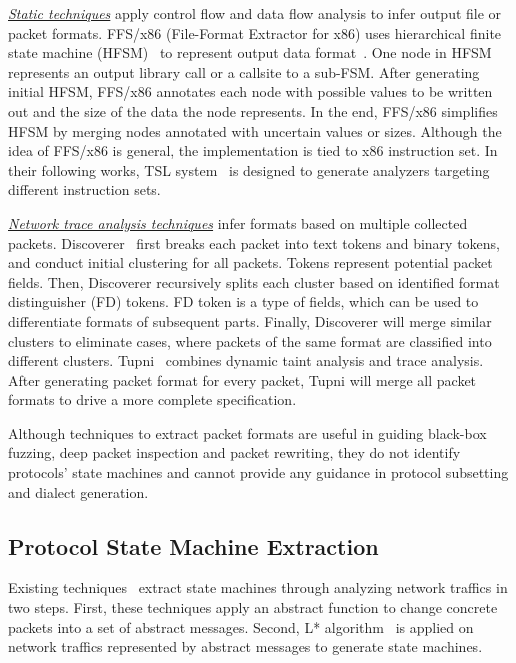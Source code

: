 {\underline{\textit{Static techniques}}} 
apply control flow and data flow analysis to infer output file or packet formats. 
FFS/x86 (File-Format Extractor for x86) uses hierarchical finite state machine (HFSM)~\citep{HFSM1, HFSM2} 
to represent output data format~\citep{Junghee,Junghee2}.
One node in HFSM represents an output library call or a callsite to a sub-FSM. 
After generating initial HFSM, 
FFS/x86 annotates each node with possible values to be written out 
and the size of the data the node represents. 
In the end, FFS/x86 simplifies HFSM by merging nodes annotated with uncertain values or sizes.
Although the idea of FFS/x86 is general, the implementation is tied to x86 instruction set. 
In their following works, TSL system~\citep{Junghee3} 
is designed to generate analyzers targeting different instruction sets. 


{\underline{\textit{Network trace analysis techniques}}}  
infer formats based on multiple collected packets. 
Discoverer~\citep{Discoverer} first breaks each packet into text tokens and binary tokens, 
and conduct initial clustering for all packets.
Tokens represent potential packet fields.
Then, Discoverer recursively splits each cluster based on 
identified format distinguisher (FD) tokens.  
FD token is a type of fields, 
which can be used to differentiate formats of subsequent parts. 
Finally, Discoverer will merge similar clusters to eliminate cases, 
where packets of the same format are classified into different clusters. 
Tupni~\citep{Tupni} combines dynamic taint analysis and trace analysis. 
After generating packet format for every packet, 
Tupni will merge all packet formats to drive a more complete specification. 

Although techniques to extract packet formats are useful in guiding black-box fuzzing, 
deep packet inspection and packet rewriting, 
they do not identify protocols’ state machines and cannot provide any guidance 
in protocol subsetting and dialect generation. 


\subsection{Protocol State Machine Extraction}

Existing techniques~\citep{botnet-inference,MACE,Prospex} extract state machines through analyzing network traffics in two steps.
First, these techniques apply an abstract function to change concrete packets into a set of abstract messages.
Second, L* algorithm~\citep{L1,L2}  is applied on network traffics represented by abstract messages to generate state machines.   


